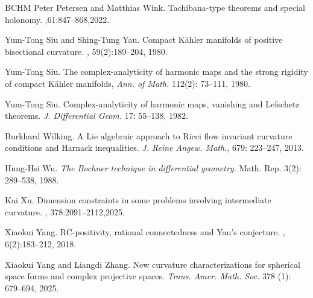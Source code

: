 \documentclass[12pt, reqno]{amsart}
\theoremstyle{plain}
\theoremstyle{definition}
\renewcommand{\>}{\rightarrow}
\renewcommand{\#}{\sharp}
\numberwithin{equation}{section} %
\begin{document}
\begin{thebibliography}{BCHM}
    Peter Petersen and Matthias Wink.
    \newblock Tachibana-type theorems and special holonomy.
    ,61:847--868,2022.


    Yum-Tong Siu and Shing-Tung Yau.
    \newblock Compact K\"ahler manifolds of positive bisectional curvature.
    , 59(2):189--204, 1980.

    Yum-Tong Siu.   The complex-analyticity of harmonic maps and the strong rigidity of compact K\"ahler manifolds,  {\em Ann. of Math.}  112(2): 73--111, 1980.


    Yum-Tong Siu.
    Complex-analyticity of harmonic maps, vanishing and Lefschetz theorems.  \emph{J. Differential Geom.} 17:  55--138, 1982.


     Burkhard Wilking.
    A Lie algebraic approach to Ricci flow invariant curvature conditions and Harnack inequalities. {\emph{J. Reine Angew. Math.}}, 679: 223--247, 2013.


    Hung-Hsi Wu. {\it The Bochner technique in differential geometry.}  Math. Rep. {3}(2): 289--538, 1988. 
    
    
    Kai  Xu.
    \newblock Dimension constraints in some problems involving intermediate curvature.
    , 378:2091--2112,2025.

    Xiaokui Yang.
    \newblock RC-positivity, rational connectedness and Yau's conjecture.
    , 6(2):183--212, 2018.

 Xiaokui Yang and Liangdi Zhang.
New curvature characterizations for spherical space forms and complex projective spaces.
\emph{Trans. Amer. Math. Soc.} 378 (1): 679--694, 2025.



\end{thebibliography}



\end{document}
